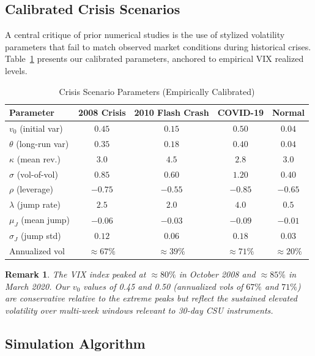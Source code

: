 \documentclass[12pt]{article}
\newtheorem{remark}{Remark}
\begin{document}
\subsection{Calibrated Crisis Scenarios}

A central critique of prior numerical studies is the use of stylized volatility parameters
that fail to match observed market conditions during historical crises. Table~\ref{tab:params}
presents our calibrated parameters, anchored to empirical VIX realized levels.

\begin{table}[h]
\centering
\caption{Crisis Scenario Parameters (Empirically Calibrated)}
\label{tab:params}
\begin{tabular}{lcccc}
\toprule
\textbf{Parameter} & \textbf{2008 Crisis} & \textbf{2010 Flash Crash} & \textbf{COVID-19} & \textbf{Normal} \\
\midrule
$v_0$ (initial var) & $0.45$ & $0.15$ & $0.50$ & $0.04$ \\
$\theta$ (long-run var) & $0.35$ & $0.18$ & $0.40$ & $0.04$ \\
$\kappa$ (mean rev.) & $3.0$ & $4.5$ & $2.8$ & $3.0$ \\
$\sigma$ (vol-of-vol) & $0.85$ & $0.60$ & $1.20$ & $0.40$ \\
$\rho$ (leverage) & $-0.75$ & $-0.55$ & $-0.85$ & $-0.65$ \\
$\lambda$ (jump rate) & $2.5$ & $2.0$ & $4.0$ & $0.5$ \\
$\mu_J$ (mean jump) & $-0.06$ & $-0.03$ & $-0.09$ & $-0.01$ \\
$\sigma_J$ (jump std) & $0.12$ & $0.06$ & $0.18$ & $0.03$ \\
Annualized vol & $\approx 67\%$ & $\approx 39\%$ & $\approx 71\%$ & $\approx 20\%$ \\
\bottomrule
\end{tabular}
\end{table}

\begin{remark}
The VIX index peaked at $\approx 80\%$ in October 2008 and $\approx 85\%$ in March 2020.
Our $v_0$ values of 0.45 and 0.50 (annualized vols of $67\%$ and $71\%$) are conservative
relative to the extreme peaks but reflect the sustained elevated volatility over multi-week
windows relevant to 30-day CSU instruments.
\end{remark}

\subsection{Simulation Algorithm}
\end{document}
